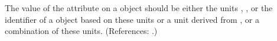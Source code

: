 The value of the attribute  on a \Model object should be
either the units , , or the identifier of a
\UnitDefinition object based on these units or a unit derived from
, or a combination of these units.  (References: .)

